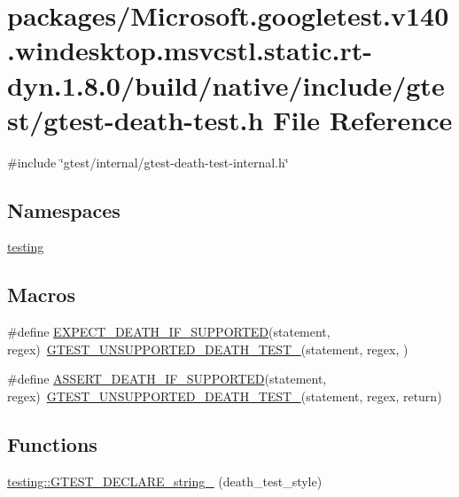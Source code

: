 \hypertarget{gtest-death-test_8h}{}\section{packages/\+Microsoft.googletest.\+v140.\+windesktop.\+msvcstl.\+static.\+rt-\/dyn.1.8.0/build/native/include/gtest/gtest-\/death-\/test.h File Reference}
\label{gtest-death-test_8h}
{\ttfamily \#include \char`\"{}gtest/internal/gtest-\/death-\/test-\/internal.\+h\char`\"{}}\newline
\subsection*{Namespaces}
\begin{DoxyCompactItemize}
\item 
 \mbox{\hyperlink{namespacetesting}{testing}}
\end{DoxyCompactItemize}
\subsection*{Macros}
\begin{DoxyCompactItemize}
\item 
\#define \mbox{\hyperlink{gtest-death-test_8h_a8564de0e012dd0898949c513d1571f8b}{E\+X\+P\+E\+C\+T\+\_\+\+D\+E\+A\+T\+H\+\_\+\+I\+F\+\_\+\+S\+U\+P\+P\+O\+R\+T\+ED}}(statement,  regex)~\mbox{\hyperlink{gtest-death-test-internal_8h_a29a145cda8bd2d0c6a78b0ac1d670d18}{G\+T\+E\+S\+T\+\_\+\+U\+N\+S\+U\+P\+P\+O\+R\+T\+E\+D\+\_\+\+D\+E\+A\+T\+H\+\_\+\+T\+E\+S\+T\+\_\+}}(statement, regex, )
\item 
\#define \mbox{\hyperlink{gtest-death-test_8h_ab2f0f25b46353767179a49ebd15b7345}{A\+S\+S\+E\+R\+T\+\_\+\+D\+E\+A\+T\+H\+\_\+\+I\+F\+\_\+\+S\+U\+P\+P\+O\+R\+T\+ED}}(statement,  regex)~\mbox{\hyperlink{gtest-death-test-internal_8h_a29a145cda8bd2d0c6a78b0ac1d670d18}{G\+T\+E\+S\+T\+\_\+\+U\+N\+S\+U\+P\+P\+O\+R\+T\+E\+D\+\_\+\+D\+E\+A\+T\+H\+\_\+\+T\+E\+S\+T\+\_\+}}(statement, regex, return)
\end{DoxyCompactItemize}
\subsection*{Functions}
\begin{DoxyCompactItemize}
\item 
\mbox{\hyperlink{namespacetesting_a37b7e87f0a5f502c6918f37d1768c1f3}{testing\+::\+G\+T\+E\+S\+T\+\_\+\+D\+E\+C\+L\+A\+R\+E\+\_\+string\+\_\+}} (death\+\_\+test\+\_\+style)
\end{DoxyCompactItemize}


